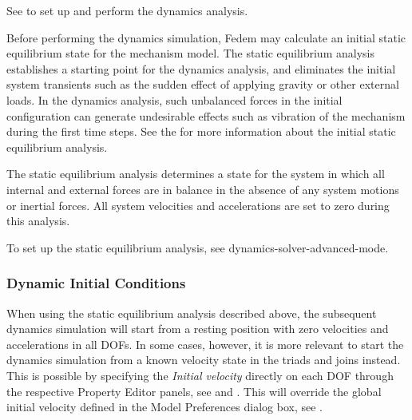 See 
to set up and perform the dynamics analysis.


Before performing the dynamics simulation, Fedem may calculate an initial static
equilibrium state for the mechanism model. The static equilibrium analysis
establishes a starting point for the dynamics analysis, and eliminates the
initial system transients such as the sudden effect of applying gravity or other
external loads. In the dynamics analysis, such unbalanced forces in the initial
configuration can generate undesirable effects such as vibration of
the mechanism during the first time steps.
See the 
for more information about the initial static equilibrium analysis.

The static equilibrium analysis determines a state for the system in which all
internal and external forces are in balance in the absence of any system motions
or inertial forces.
All system velocities and accelerations are set to zero during this analysis.

To set up the static equilibrium analysis, see
              {dynamics-solver-advanced-mode}.

\subsubsection{Dynamic Initial Conditions}

When using the static equilibrium analysis described above,
the subsequent dynamics simulation will start from a resting position with
zero velocities and accelerations in all DOFs. In some cases, however,
it is more relevant to start the dynamics simulation from a known velocity
state in the triads and joins instead. This is possible by specifying
the {\sl Initial velocity} directly on each DOF through the respective
Property Editor panels, see 
and .
This will override the global initial velocity defined in the Model Preferences
dialog box, see .


